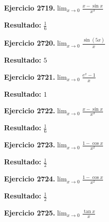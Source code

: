\documentclass[10pt,a4paper]{article}
\begin{document}
\begin{ejbox}
\textbf{Ejercicio 2719.}\quad $\lim_{x\to 0} \frac{x-\sin x}{x^3}$
\end{ejbox}

\begin{solbox}
\textbf{Resultado:} \(\displaystyle \frac{1}{6}\)
\end{solbox}

\begin{ejbox}
\textbf{Ejercicio 2720.}\quad $\lim_{x\to 0} \frac{\sin(5x)}{x}$
\end{ejbox}

\begin{solbox}
\textbf{Resultado:} \(\displaystyle 5\)
\end{solbox}

\newpage
\begin{ejbox}
\textbf{Ejercicio 2721.}\quad $\lim_{x\to 0} \frac{e^x-1}{x}$
\end{ejbox}

\begin{solbox}
\textbf{Resultado:} \(\displaystyle 1\)
\end{solbox}

\begin{ejbox}
\textbf{Ejercicio 2722.}\quad $\lim_{x\to 0} \frac{x-\sin x}{x^3}$
\end{ejbox}

\begin{solbox}
\textbf{Resultado:} \(\displaystyle \frac{1}{6}\)
\end{solbox}

\begin{ejbox}
\textbf{Ejercicio 2723.}\quad $\lim_{x\to 0} \frac{1-\cos x}{x^2}$
\end{ejbox}

\begin{solbox}
\textbf{Resultado:} \(\displaystyle \frac{1}{2}\)
\end{solbox}

\newpage
\begin{ejbox}
\textbf{Ejercicio 2724.}\quad $\lim_{x\to 0} \frac{1-\cos x}{x^2}$
\end{ejbox}

\begin{solbox}
\textbf{Resultado:} \(\displaystyle \frac{1}{2}\)
\end{solbox}

\begin{ejbox}
\textbf{Ejercicio 2725.}\quad $\lim_{x\to 0} \frac{\tan x}{x}$
\end{ejbox}
\end{document}
